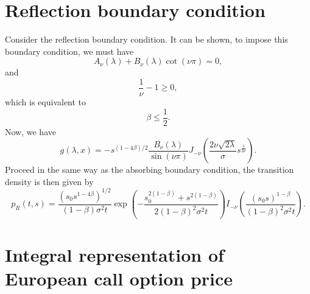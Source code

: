 \documentclass[12pt]{article}
\begin{document}
\section{Reflection boundary condition}

  Consider the reflection boundary condition. It can be shown, to impose this boundary condition, we must have
  \begin{equation}
    A_{\nu}(\lambda)+B_{\nu}(\lambda)\cot(\nu\pi)=0,
  \end{equation}
  and
  \begin{equation}
    \frac{1}{\nu}-1\geq 0,
  \end{equation}
  which is equivalent to
  \begin{equation}
    \beta \leq \frac{1}{2}.
  \end{equation}
  Now, we have
  \begin{equation}
    g(\lambda,x)=-s^{(1-4\beta)/2}\frac{B_{\nu}(\lambda)}{\sin(\nu\pi)}J_{-\nu}\left(\frac{2\nu\sqrt{2\lambda}}{\sigma}s^{\frac{1}{2\nu}}\right).
  \end{equation}
  Proceed in the same way as the absorbing boundary condition, the transition density is then given by
  \begin{equation}
    p_R(t,s)=\frac{\left(s_0s^{1-4\beta}\right)^{1/2}}{(1-\beta)\sigma^2t}
    \exp\left(-\frac{s_0^{2(1-\beta)}+s^{2(1-\beta)}}{2(1-\beta)^2\sigma^2t}\right)
    I_{-\nu}\left(\frac{\left(s_0s\right)^{1-\beta}}{(1-\beta)^2\sigma^2t}\right).
  \end{equation}




\section{Integral representation of European call option price}
\end{document}
